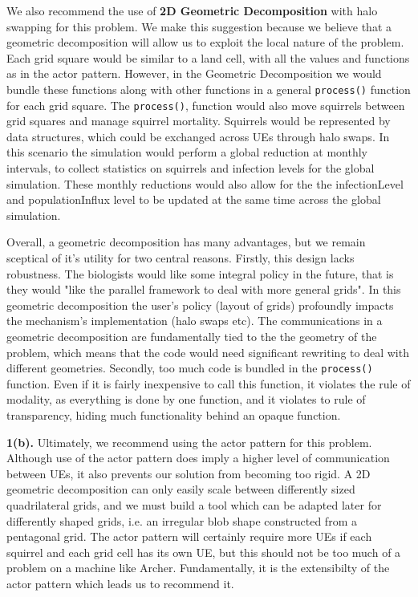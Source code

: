 \documentclass[conference]{IEEEtran}
\begin{document}
We also recommend the use of \textbf{2D Geometric Decomposition} with halo swapping for this problem. We make this suggestion because we believe that a geometric decomposition will allow us to exploit the local nature of the problem. Each grid square would be similar to a land cell, with all the values and functions as in the actor pattern. However, in the Geometric Decomposition we would bundle these functions along with other functions in a general \texttt{process()} function for each grid square. The \texttt{process()}, function would also move squirrels between grid squares and manage squirrel mortality. Squirrels would be represented by data structures, which could be exchanged across UEs through halo swaps. In this scenario the simulation would perform a global reduction at monthly intervals, to collect statistics on squirrels and infection levels for the global simulation. These monthly reductions would also allow for the the infectionLevel and populationInflux level to be updated at the same time across the global simulation.

Overall, a geometric decomposition has many advantages, but we remain sceptical of it's utility for two central reasons. Firstly, this design lacks robustness. The biologists would like some integral policy in the future, that is they would "like the parallel framework to deal with more general grids". In this geometric decomposition the user's policy (layout of grids) profoundly impacts the mechanism's implementation (halo swaps etc). The communications in a geometric decomposition are fundamentally tied to the the geometry of the problem, which means that the code would need significant rewriting to deal with different geometries.
Secondly, too much code is bundled in the \texttt{process()} function. Even if it is fairly inexpensive to call this function, it violates the rule of modality, as everything is done by one function, and it violates to rule of transparency, hiding much functionality behind an opaque function.\newline

\noindent\textbf{1(b).} \newline
Ultimately, we recommend using the actor pattern for this problem. Although use of the actor pattern does imply a higher level of communication between UEs, it also prevents our solution from becoming too rigid. A 2D geometric decomposition can only easily scale between differently sized quadrilateral grids, and we must build a tool which can be adapted later for differently shaped grids, i.e. an irregular blob shape constructed from a pentagonal grid. The actor pattern will certainly require more UEs if each squirrel and each grid cell has its own UE, but this should not be too much of a problem on a machine like Archer. Fundamentally, it is the extensibilty of the actor pattern which leads us to recommend it. \newline
\end{document}
